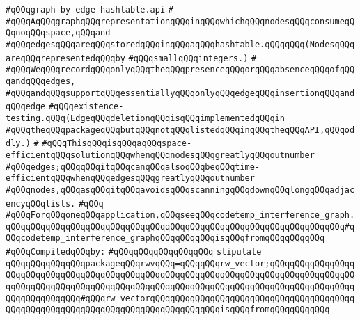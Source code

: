 \label{src/lib/std/src/graph-by-edge-hashtable.api}
\verb|#qQQqgraph-by-edge-hashtable.api|\newline
\verb|#|\newline
\verb|#qQQqAqQQqgraphqQQqrepresentationqQQqinqQQqwhichqQQqnodesqQQqconsumeqQQqnoqQQqspace,qQQqand|\newline
\verb|#qQQqedgesqQQqareqQQqstoredqQQqinqQQqaqQQqhashtable.qQQqqQQq(NodesqQQqareqQQqrepresentedqQQqby|\newline
\verb|#qQQqsmallqQQqintegers.)|\newline
\verb|#|\newline
\verb|#qQQqWeqQQqrecordqQQqonlyqQQqtheqQQqpresenceqQQqorqQQqabsenceqQQqofqQQqandqQQqedges,|\newline
\verb|#qQQqandqQQqsupportqQQqessentiallyqQQqonlyqQQqedgeqQQqinsertionqQQqandqQQqedge|\newline
\verb|#qQQqexistence-testing.qQQq(EdgeqQQqdeletionqQQqisqQQqimplementedqQQqin|\newline
\verb|#qQQqtheqQQqpackageqQQqbutqQQqnotqQQqlistedqQQqinqQQqtheqQQqAPI,qQQqoddly.)|\newline
\verb|#|\newline
\verb|#qQQqThisqQQqisqQQqaqQQqspace-efficientqQQqsolutionqQQqwhenqQQqnodesqQQqgreatlyqQQqoutnumber|\newline
\verb|#qQQqedges;qQQqqQQqitqQQqcanqQQqalsoqQQqbeqQQqtime-efficientqQQqwhenqQQqedgesqQQqgreatlyqQQqoutnumber|\newline
\verb|#qQQqnodes,qQQqasqQQqitqQQqavoidsqQQqscanningqQQqdownqQQqlongqQQqadjacencyqQQqlists.|\newline
\verb|#qQQq|\newline
\verb|#qQQqForqQQqoneqQQqapplication,qQQqseeqQQqcodetemp_interference_graph.qQQqqQQqqQQqqQQqqQQqqQQqqQQqqQQqqQQqqQQqqQQqqQQqqQQqqQQqqQQqqQQqqQQq#qQQqcodetemp_interference_graphqQQqqQQqqQQqisqQQqfromqQQqqQQqqQQq|\newline
\newline
\verb|#qQQqCompiledqQQqby:|\newline
\verb|#qQQqqQQqqQQqqQQqqQQq|\newline
\newline
\verb|stipulate|\newline
\verb|qQQqqQQqqQQqqQQqpackageqQQqrwvqQQq=qQQqqQQqrw_vector;qQQqqQQqqQQqqQQqqQQqqQQqqQQqqQQqqQQqqQQqqQQqqQQqqQQqqQQqqQQqqQQqqQQqqQQqqQQqqQQqqQQqqQQqqQQqqQQqqQQqqQQqqQQqqQQqqQQqqQQqqQQqqQQqqQQqqQQqqQQqqQQqqQQqqQQqqQQqqQQqqQQqqQQqqQQq#qQQqrw_vectorqQQqqQQqqQQqqQQqqQQqqQQqqQQqqQQqqQQqqQQqqQQqqQQqqQQqqQQqqQQqqQQqqQQqqQQqqQQqqQQqqQQqisqQQqfromqQQqqQQqqQQq|\newline
